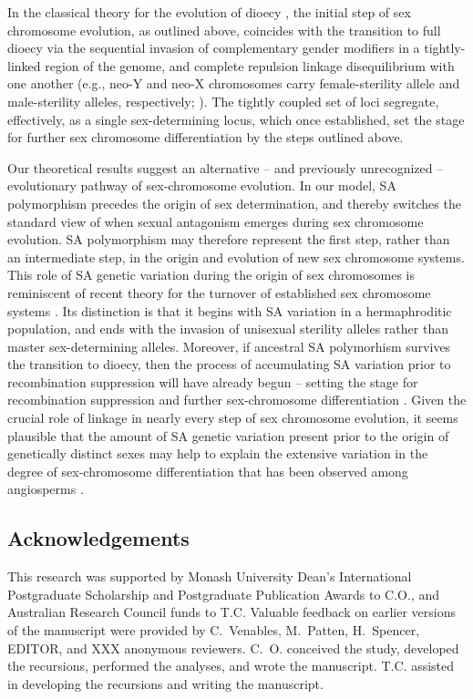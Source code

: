 \documentclass{article}
\begin{document}
In the classical theory for the evolution of dioecy \citep{Charlesworth1978a}, the initial step of sex chromosome evolution, as outlined above, coincides with the transition to full dioecy via the sequential invasion of complementary gender modifiers in a tightly-linked region of the genome, and complete repulsion linkage disequilibrium with one another (e.g., neo-Y and neo-X chromosomes carry female-sterility allele and male-sterility alleles, respectively; \citealt{Charlesworth1978a}). The tightly coupled set of loci segregate, effectively, as a single sex-determining locus, which once established, set the stage for further sex chromosome differentiation by the steps outlined above.

Our theoretical results suggest an alternative -- and previously unrecognized -- evolutionary pathway of sex-chromosome evolution. In our model, SA polymorphism precedes the origin of sex determination, and thereby switches the standard view of when sexual antagonism emerges during sex chromosome evolution. SA polymorphism may therefore represent the first step, rather than an intermediate step, in the origin and evolution of new sex chromosome systems. This role of SA genetic variation during the origin of sex chromosomes is reminiscent of recent theory for the turnover of established sex chromosome systems \citep{vanDoornKirkpatrick2007,vanDoornKirkpatrick2010}. Its distinction is that it begins with SA variation in a hermaphroditic population, and ends with the invasion of unisexual sterility alleles rather than master sex-determining alleles. Moreover, if ancestral SA polymorhism survives the transition to dioecy, then the process of accumulating SA variation prior to recombination suppression will have already begun -- setting the stage for recombination suppression and further sex-chromosome differentiation \citep{Charlesworth1978a,Rice1987,Bachtrog2006,Qiuetal2013}. Given the crucial role of linkage in nearly every step of sex chromosome evolution, it seems plausible that the amount of SA genetic variation present prior to the origin of genetically distinct sexes may help to explain the extensive variation in the degree of sex-chromosome differentiation that has been observed among angiosperms \citep{Charlesworth2002,Renner2014,Bachtrog2014}.


\subsection*{Acknowledgements}
This research was supported by Monash University Dean's International Postgraduate Scholarship and Postgraduate Publication Awards to C.O., and Australian Research Council funds to T.C. Valuable feedback on earlier versions of the manuscript were provided by C.~Venables, M.~Patten, H.~Spencer, EDITOR, and XXX anonymous reviewers. C.~O. conceived the study, developed the recursions, performed the analyses, and wrote the manuscript. T.C. assisted in developing the recursions and writing the manuscript.
\end{document}
